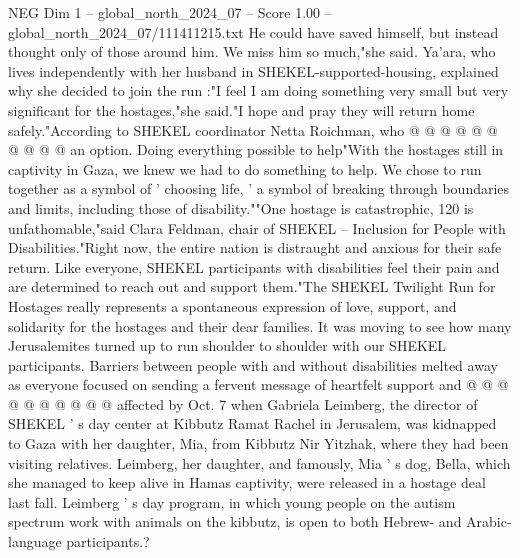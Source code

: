 \begin{textsample}{NEG Dim 1 – global\_north\_2024\_07 – Score 1.00 – global\_north\_2024\_07/111411215.txt}
He could have saved himself, but instead thought only of those around him.
We miss him so much,"she said.
Ya'ara, who lives independently with her husband in SHEKEL-supported-housing, explained why she decided to join the run :"I feel I am doing something very small but very significant for the hostages,"she said."I hope and pray they will return home safely."According to SHEKEL coordinator Netta Roichman, who @ @ @ @ @ @ @ @ @ @ an option.
Doing everything possible to help"With the hostages still in captivity in Gaza, we knew we had to do something to help.
We chose to run together as a symbol of ' choosing life, ' a symbol of breaking through boundaries and limits, including those of disability.""One hostage is catastrophic, 120 is unfathomable,"said Clara Feldman, chair of SHEKEL -- Inclusion for People with Disabilities."Right now, the entire nation is distraught and anxious for their safe return.
Like everyone, SHEKEL participants with disabilities feel their pain and are determined to reach out and support them."The SHEKEL Twilight Run for Hostages really represents a spontaneous expression of love, support, and solidarity for the hostages and their dear families.
It was moving to see how many Jerusalemites turned up to run shoulder to shoulder with our SHEKEL participants.
Barriers between people with and without disabilities melted away as everyone focused on sending a fervent message of heartfelt support and @ @ @ @ @ @ @ @ @ @ affected by Oct. 7 when Gabriela Leimberg, the director of SHEKEL ' s day center at Kibbutz Ramat Rachel in Jerusalem, was kidnapped to Gaza with her daughter, Mia, from Kibbutz Nir Yitzhak, where they had been visiting relatives.
Leimberg, her daughter, and famously, Mia ' s dog, Bella, which she managed to keep alive in Hamas captivity, were released in a hostage deal last fall.
Leimberg ' s day program, in which young people on the autism spectrum work with animals on the kibbutz, is open to both Hebrew- and Arabic-language participants.?

\end{textsample}
